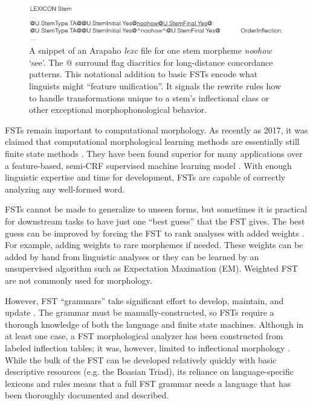 \documentclass[12pt]{article}
\begin{document}
\begin{figure}[b]
\begin{center}
\includegraphics[width=0.95\columnwidth]{FSTlexicon.PNG}
\caption{A snippet of an Arapaho \textit{lexc} file for one stem morpheme \textit{noohow} `see'. The @ surround flag diacritics for long-distance concordance patterns. This notational addition to basic FSTs encode what linguists might ``feature unification''. It signals the rewrite rules how to handle transformations unique to a stem's inflectional class or other exceptional morphophonological behavior.}
\label{fig:lexc}
\end{center}
\end{figure}

FSTs remain important to computational morphology. As recently as 2017, it was claimed that computational morphological learning methods are essentially still finite state methods \cite{goldsmith_computational_2017}. They have been found superior for many applications over a feature-based, semi-CRF supervised machine learning model \cite{cotterell_labeled_2015}. With enough linguistic expertise and time for development, FSTs are capable of correctly analyzing any well-formed word.  

FSTs cannot be made to generalize to unseen forms, but sometimes it is practical for downstream tasks to have just one ``best guess'' that the FST gives. The best guess can be improved by forcing the FST to rank analyses with added weights \cite{roark_computational_2007}. For example, adding weights to rare morphemes if needed. These weights can be added by hand from linguistic analyses or they can be learned by an unsupervised algorithm such as Expectation Maximation (EM). Weighted FST are not commonly used for morphology.

However, FST “grammars” take significant effort to develop, maintain, and update \cite{durrett_supervised_2013,moeller_neural_2018}. The grammar must be manually-constructed, so FSTs require a thorough knowledge of both the language and finite state machines. Although in at least one case, a FST morphological analyzer has been constructed from labeled inflection tables; it was, however, limited to inflectional morphology \cite{forsberg_learning_2016}. While the bulk of the FST can be developed relatively quickly with basic descriptive resources (e.g. the Boasian Triad), its reliance on language-specific lexicons and rules means that a full FST grammar needs a language that has been thoroughly documented and described.  
\end{document}
